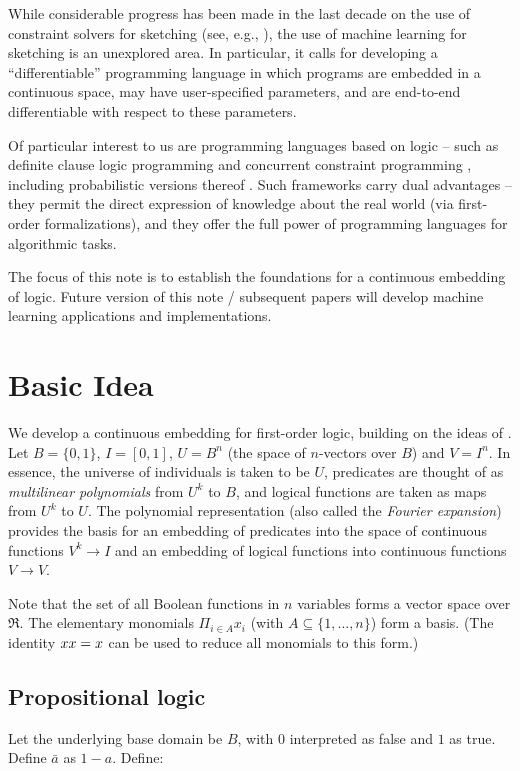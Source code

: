 \documentclass{article} %
\begin{document}
While considerable progress has been made in the last decade on the
use of constraint solvers for sketching (see, e.g., \cite{armando}),
the use of machine learning for sketching is an unexplored area. In
particular, it calls for developing a ``differentiable'' programming
language in which programs are embedded in a continuous space, may
have user-specified parameters, and are end-to-end differentiable with
respect to these parameters.  

Of particular interest to us are programming languages based on logic
-- such as definite clause logic programming \cite{Kowalski76} and
concurrent constraint programming \cite{CCP}, including probabilistic
versions thereof \cite{muggleton:srl07,Gupta97b,cussens}. Such
frameworks carry dual advantages -- they permit the direct expression
of knowledge about the real world (via first-order formalizations),
and they offer the full power of programming languages for algorithmic
tasks. 

The focus of this note is to establish the foundations for a
continuous embedding of logic. Future version of this note /
subsequent papers will develop machine learning applications and
implementations. 

\section{Basic Idea}
We develop a continuous embedding for first-order logic, building on
the ideas of \cite{boolean-function}. Let $B=\{0,1\}$, $I=[0,1]$,
$U=B^n$ (the space of $n$-vectors over $B$) and $V=I^n$. In essence, the universe of
individuals is taken to be $U$, predicates are thought of as {\em multilinear polynomials} from $U^k$ to
$B$, and logical functions are taken as maps from $U^k$ to $U$. The
polynomial representation (also called the {\em Fourier expansion})
provides the basis for an embedding of  predicates into the space of
continuous functions $V^k \rightarrow I$ and an embedding of logical
functions into continuous functions $V\rightarrow V$.   

Note that the set of all Boolean functions in $n$ variables forms a
vector space over $\Re$. The elementary monomials $\Pi_{i\in A} x_i$
(with $A \subseteq \{1,\ldots, n\}$) form a basis. (The identity
$x x=x$ can be used to reduce all monomials to this form.) 

\subsection{Propositional logic}\label{section:prop-logic}
Let the underlying base domain be $B$, with $0$ interpreted as false and $1$ as true. Define $\bar{a}$ as $1-a$. Define:
\end{document}

